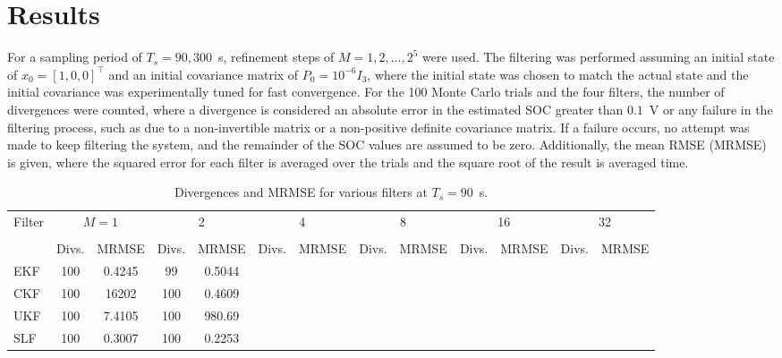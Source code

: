 \documentclass[../zhang_thesis.tex]{subfiles}
\begin{document}
\chapter{Results}


For a sampling period of $T_s=90,300$~s, refinement steps of $M=1,2,\dots,2^5$ were used. The filtering was performed assuming an initial state of $x_0=[1,0,0]^\top$ and an initial covariance matrix of $P_0=10^{-6} I_3$, where the initial state was chosen to match the actual state and the initial covariance was experimentally tuned for fast convergence. For the 100 Monte Carlo trials and the four filters, the number of divergences were counted, where a divergence is considered an absolute error in the estimated SOC greater than $0.1$~V or any failure in the filtering process, such as due to a non-invertible matrix or a non-positive definite covariance matrix. If a failure occurs, no attempt was made to keep filtering the system, and the remainder of
the SOC values are assumed to be zero. Additionally, the mean RMSE (MRMSE) is given, where the squared error for each filter is averaged over
the trials and the square root of the result is averaged time.

\begin{sidewaystable}
\caption{Divergences and MRMSE for various filters at $T_s=90$~s.}
\centering
\begin{tabular}{l*{12}{c}}
\toprule
Filter & \multicolumn{2}{c}{$M=1$} & \multicolumn{2}{c}{2} & \multicolumn{2}{c}{4} & \multicolumn{2}{c}{8} & \multicolumn{2}{c}{16} & \multicolumn{2}{c}{32} \\
\cmidrule(r){2-3} \cmidrule(lr){4-5} \cmidrule(lr){6-7} \cmidrule(lr){8-9} \cmidrule(lr){10-11} \cmidrule(lr){12-13} \\
& Divs. & MRMSE & Divs. & MRMSE & Divs. & MRMSE & Divs. & MRMSE & Divs. & MRMSE & Divs. & MRMSE \\
\midrule
EKF & 100 & 0.4245 &  99 & 0.5044 \\
CKF & 100 & 16202  & 100 & 0.4609 \\
UKF & 100 & 7.4105 & 100 & 980.69 \\
SLF & 100 & 0.3007 & 100 & 0.2253 \\
\bottomrule
\end{tabular}
\end{sidewaystable}
\end{document}
